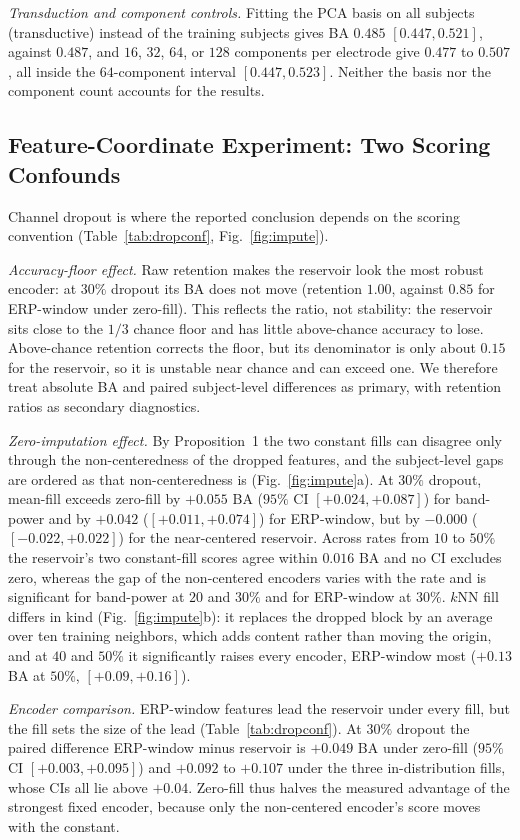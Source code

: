 \documentclass[conference]{IEEEtran}
\begin{document}
\emph{Transduction and component controls.} Fitting the PCA basis on all subjects (transductive) instead of the training subjects gives BA $0.485$ $[0.447,0.521]$, against $0.487$, and $16$, $32$, $64$, or $128$ components per electrode give $0.477$ to $0.507$, all inside the $64$-component interval $[0.447,0.523]$. Neither the basis nor the component count accounts for the results.

\subsection{Feature-Coordinate Experiment: Two Scoring Confounds}
\label{sec:perturb}
Channel dropout is where the reported conclusion depends on the scoring convention (Table~\ref{tab:dropconf}, Fig.~\ref{fig:impute}).

\emph{Accuracy-floor effect.} Raw retention makes the reservoir look the most robust encoder: at $30\%$ dropout its BA does not move (retention $1.00$, against $0.85$ for ERP-window under zero-fill). This reflects the ratio, not stability: the reservoir sits close to the $1/3$ chance floor and has little above-chance accuracy to lose. Above-chance retention corrects the floor, but its denominator is only about $0.15$ for the reservoir, so it is unstable near chance and can exceed one. We therefore treat absolute BA and paired subject-level differences as primary, with retention ratios as secondary diagnostics.

\emph{Zero-imputation effect.} By Proposition~1 the two constant fills can disagree only through the non-centeredness of the dropped features, and the subject-level gaps are ordered as that non-centeredness is (Fig.~\ref{fig:impute}a). At $30\%$ dropout, mean-fill exceeds zero-fill by $+0.055$ BA ($95\%$ CI $[+0.024,+0.087]$) for band-power and by $+0.042$ ($[+0.011,+0.074]$) for ERP-window, but by $-0.000$ ($[-0.022,+0.022]$) for the near-centered reservoir. Across rates from $10$ to $50\%$ the reservoir's two constant-fill scores agree within $0.016$ BA and no CI excludes zero, whereas the gap of the non-centered encoders varies with the rate and is significant for band-power at $20$ and $30\%$ and for ERP-window at $30\%$. $k$NN fill differs in kind (Fig.~\ref{fig:impute}b): it replaces the dropped block by an average over ten training neighbors, which adds content rather than moving the origin, and at $40$ and $50\%$ it significantly raises every encoder, ERP-window most ($+0.13$ BA at $50\%$, $[+0.09,+0.16]$).

\emph{Encoder comparison.} ERP-window features lead the reservoir under every fill, but the fill sets the size of the lead (Table~\ref{tab:dropconf}). At $30\%$ dropout the paired difference ERP-window minus reservoir is $+0.049$ BA under zero-fill ($95\%$ CI $[+0.003,+0.095]$) and $+0.092$ to $+0.107$ under the three in-distribution fills, whose CIs all lie above $+0.04$. Zero-fill thus halves the measured advantage of the strongest fixed encoder, because only the non-centered encoder's score moves with the constant.
\end{document}
